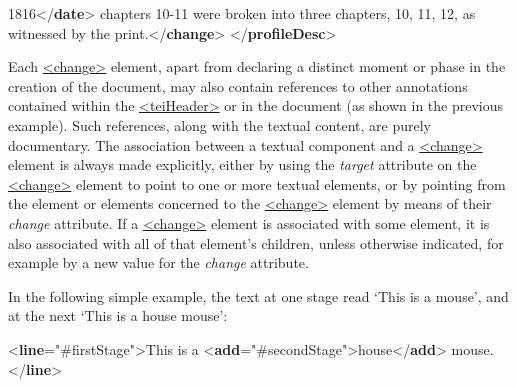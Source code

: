 \begin{shaded}
\hspace*{1em}\hspace*{1em}\hspace*{1em}\hspace*{1em}\hspace*{1em}\hspace*{1em}\hspace*{1em}\hspace*{1em} 1816{</\textbf{date}>} chapters 10-11 were broken into three chapters, 10, 11, 12, as\mbox{}\newline 
\hspace*{1em}\hspace*{1em}\hspace*{1em}\hspace*{1em}\hspace*{1em}\hspace*{1em} witnessed by the print.{</\textbf{change}>}\mbox{}\newline 
\hspace*{1em}\mbox{}\newline 
{}\mbox{}\newline 
{</\textbf{profileDesc}>}\end{shaded}\egroup\par \par
Each \hyperref[TEI.change]{<change>} element, apart from declaring a distinct moment or phase in the creation of the document, may also contain references to other annotations contained within the \hyperref[TEI.teiHeader]{<teiHeader>} or in the document (as shown in the previous example). Such references, along with the textual content, are purely documentary. The association between a textual component and a \hyperref[TEI.change]{<change>} element is always made explicitly, either by using the {\itshape target} attribute on the \hyperref[TEI.change]{<change>} element to point to one or more textual elements, or by pointing from the element or elements concerned to the \hyperref[TEI.change]{<change>} element by means of their {\itshape change} attribute. If a \hyperref[TEI.change]{<change>} element is associated with some element, it is also associated with all of that element's children, unless otherwise indicated, for example by a new value for the {\itshape change} attribute.\par
In the following simple example, the text at one stage read ‘This is a mouse’, and at the next ‘This is a house mouse’: \par\bgroup{}\exampleFont \begin{shaded}\noindent\mbox{}{<\textbf{line}\hspace*{1em}{change}="{\#firstStage}">}This is a {<\textbf{add}\hspace*{1em}{change}="{\#secondStage}">}house{</\textbf{add}>}\mbox{}\newline 
 mouse.{</\textbf{line}>}\end{shaded}\egroup\par \par
